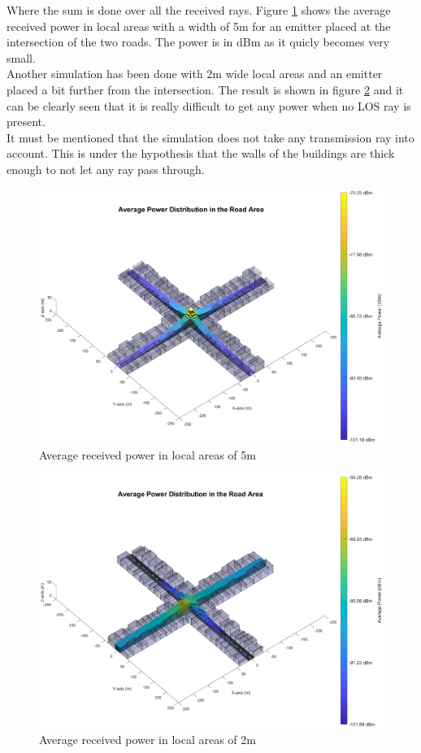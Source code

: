 \documentclass[10pt,a4paper]{ULBreport}
\begin{document}
Where the sum is done over all the received rays. Figure \ref{fig:average_power} shows the average received power in local areas with a width of 5m for an emitter placed at the intersection of the two roads. The power is in dBm as it quicly becomes very small. \\
Another simulation has been done with 2m wide local areas and an emitter placed a bit further from the intersection. The result is shown in figure \ref{fig:average_power_2m} and it can be clearly seen that it is really difficult to get any power when no LOS ray is present. \\
It must be mentioned that the simulation does not take any transmission ray into account. This is under the hypothesis that the walls of the buildings are thick enough to not let any ray pass through.

\begin{figure}[H]
    \centering
    \includegraphics[width=1\textwidth]{3_5.eps}
    \caption{Average received power in local areas of 5m}
    \label{fig:average_power}
\end{figure}

\begin{figure}[H]
    \centering
    \includegraphics[width=1\textwidth]{3_5_alt.eps}
    \caption{Average received power in local areas of 2m}
    \label{fig:average_power_2m}
\end{figure}
\end{document}
